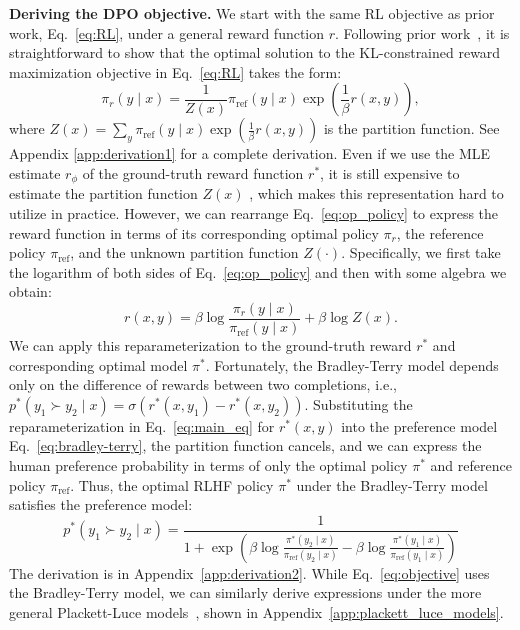 \documentclass{article}
\newcommand{\piref}{\pi_\text{ref}}
\begin{document}
\textbf{Deriving the DPO objective.} We start with the same RL objective as prior work, Eq.~\ref{eq:RL}, under a general reward function $r$. Following prior work~\citep{peters2007reinforcement, peng2019advantage, korbak2022reinforcement, go2023aligning}, it is straightforward to show that the optimal solution to the KL-constrained reward maximization objective in Eq.~\ref{eq:RL} takes the form:
\begin{equation}\label{eq:op_policy}
    \pi_r(y\mid x) = \frac{1}{Z(x)}\piref(y\mid x)\exp\left(\frac{1}{\beta}r(x, y)\right),
\end{equation}
where $Z(x) =\sum_{y}\piref(y\mid x)\exp\left(\frac{1}{\beta}r(x, y)\right)$ is the partition function. See Appendix \ref{app:derivation1} for a complete derivation. Even if we use the MLE estimate $r_{\phi}$ of the ground-truth reward function $r^*$, it is still expensive to estimate the partition function $Z(x)$ \citep{korbak2022reinforcement, go2023aligning}, which makes this representation hard to utilize in practice. However, we can rearrange Eq.~\ref{eq:op_policy} to express the reward function in terms of its corresponding optimal policy $\pi_r$, the reference policy $\piref$, and the unknown partition function $Z(\cdot)$. Specifically, we first take the logarithm of both sides of Eq.~\ref{eq:op_policy} and then with some algebra we obtain:
\begin{equation}\label{eq:main_eq}
    r(x,y) =\beta \log \frac{\pi_r(y\mid x)}{\piref(y\mid x)} + \beta \log Z(x).
\end{equation}
We can apply this reparameterization to the ground-truth reward $r^*$ and corresponding optimal model $\pi^*$. Fortunately, the Bradley-Terry model depends only on the difference of rewards between two completions, i.e., ${p^*(y_1 \succ y_2 \mid x) = \sigma(r^*(x, y_1) - r^*(x, y_2))}$. Substituting the reparameterization in Eq.~\ref{eq:main_eq} for $r^*(x,y)$ into the preference model Eq.~\ref{eq:bradley-terry}, the partition function cancels, and we can express the human preference probability in terms of only the optimal policy $\pi^*$ and reference policy $\piref$. Thus, the optimal RLHF policy $\pi^*$ under the Bradley-Terry model satisfies the preference model:
\begin{equation}\label{eq:objective}
    p^*(y_1\succ y_2 \mid x)=\frac{1}{1 + \exp\left(\beta \log \frac{\pi^*(y_2\mid x)}{\piref(y_2\mid x)} - \beta \log \frac{\pi^*(y_1\mid x)}{\piref(y_1\mid x)}\right)}
\end{equation}
The derivation is in Appendix~\ref{app:derivation2}. While Eq.~\ref{eq:objective} uses the Bradley-Terry model, we can similarly derive expressions under the more general Plackett-Luce models~\citep{plackett1975analysis, luce2012individual}, shown in Appendix~\ref{app:plackett_luce_models}.
\end{document}
